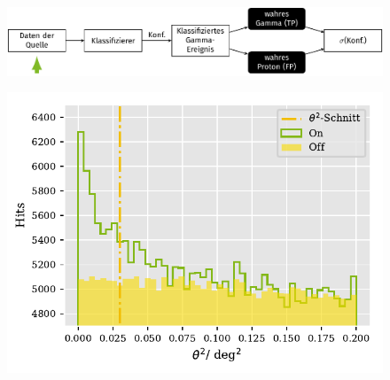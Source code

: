 \documentclass[aspectratio=1610, professionalfonts, 9pt]{beamer}
\begin{document}
\begin{frame}
  \begin{minipage}[t][0.3\textheight][t]{\textwidth}
	  \begin{figure}
		\includegraphics[scale=0.5]{./tikz/Conf/Conf1.pdf}
	  \end{figure}
  \end{minipage}
  \begin{minipage}[t][0.7\textheight][t]{\textwidth}
	  \begin{figure}
		\centering
		\includegraphics[height=0.7\textheight]{./Plots/on_off_ratio.pdf}
	  \end{figure}
  \end{minipage}
\end{frame}
\end{document}
